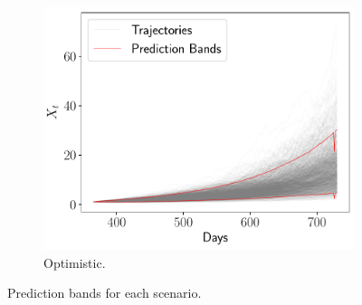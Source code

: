 \documentclass[11pt]{article}
\theoremstyle{definition}
\theoremstyle{remark}
\theoremstyle{remark}
\begin{document}
\begin{figure}[H]
\begin{subfigure}[b]{0.45\textwidth}
      \includegraphics[scale=0.45]{bands_optimistic.pdf}
      \caption{Optimistic.}
  \end{subfigure}
  \caption{Prediction bands for each scenario.}
\end{figure}
\end{document}
